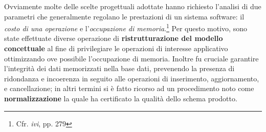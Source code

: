 \documentclass[10pt,a4paper, titlepage]{article}
\begin{document}
Ovviamente molte delle scelte progettuali adottate hanno richiesto l'analisi di due parametri che generalmente regolano le prestazioni di un sistema software: il \textit{costo di una operazione} e l'\textit{occupazione di memoria}.\footnote{Cfr. \textit{ivi}, pp. 279} Per questo motivo, sono state effettuate diverse operazione di \textbf{ristrutturazione del modello concettuale} al fine di privilegiare le operazioni di interesse applicativo ottimizzando ove possibile l'occupazione di memoria.
Inoltre fu cruciale garantire l'integrità dei dati memorizzati nella base dati, prevenendo la presenza di ridondanza e incoerenza in seguito alle operazioni di inserimento, aggiornamento, e cancellazione; in altri termini si è fatto ricorso ad un procedimento noto come \textbf{normalizzazione} la quale ha certificato la qualità dello schema prodotto.
\end{document}
